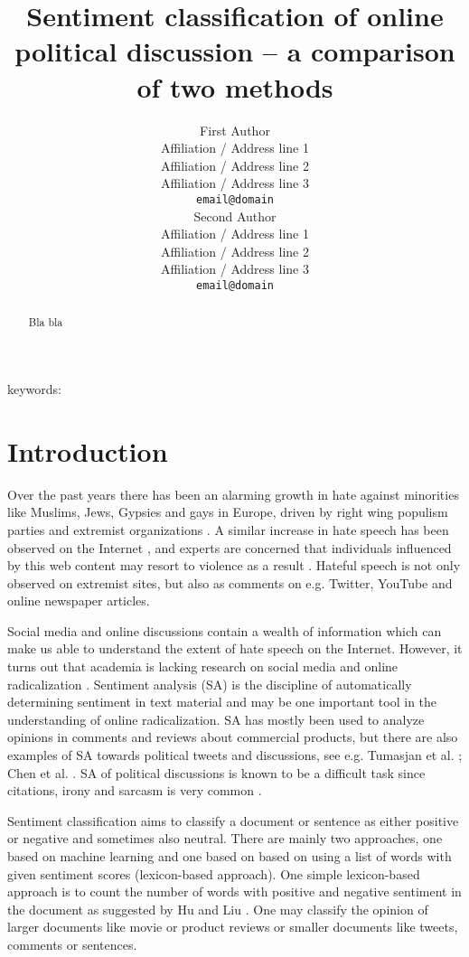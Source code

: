 \documentclass[11pt]{article}
\title{Sentiment classification of online political discussion -- a comparison of two methods}
\author{First Author \\
  Affiliation / Address line 1 \\
  Affiliation / Address line 2 \\
  Affiliation / Address line 3 \\
  {\tt email@domain} \\\And
  Second Author \\
  Affiliation / Address line 1 \\
  Affiliation / Address line 2 \\
  Affiliation / Address line 3 \\
  {\tt email@domain} \\}
\date{}
\begin{document}


\maketitle
\begin{abstract}
Bla bla
\end{abstract}

keywords: \textit{}

\section{Introduction}
\label{sec:introduction}

Over the past years there has been an alarming growth in hate against minorities like Muslims, Jews, Gypsies and gays in Europe, driven by right wing populism parties and extremist organizations \cite{r4,r11}. A similar increase in hate speech has been observed on the Internet \cite{r6,s2}, and experts are concerned that individuals influenced by this web content may resort to violence as a result \cite{Strommen12,Sunde13}. Hateful speech is not only observed on extremist sites, but also as comments on e.g. Twitter, YouTube and online newspaper articles.  

Social media and online discussions contain a wealth of information which can make us able to understand the extent of hate speech on the Internet. However, it turns out that academia is lacking research on social media and online radicalization \cite{s1}. Sentiment analysis (SA) is the discipline of automatically determining sentiment in text material and may be one important tool in the understanding of online radicalization. SA has mostly been used to analyze opinions in comments and reviews about commercial products, but there are also examples of SA towards political tweets and discussions, see e.g. Tumasjan et al. ; Chen et al. . SA of political discussions is known to be a difficult task since citations, irony and sarcasm is very common \cite{Bing12}.

Sentiment classification aims to classify a document or sentence as either positive or negative and sometimes also neutral. There are mainly two approaches, one based on machine learning and one based on based on using a list of words with given sentiment scores (lexicon-based approach). One simple lexicon-based approach is to count the number of words with positive and negative sentiment in the document as suggested by Hu and Liu . One may classify the opinion of larger documents like movie or product reviews or smaller documents like tweets, comments or sentences. %
\end{document}
